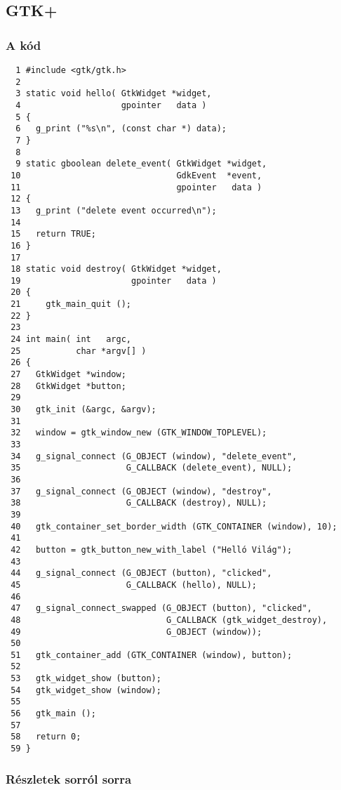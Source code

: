\documentclass[a4paper,10pt]{article}
\begin{document}
\subsection{GTK+}

\subsubsection{A kód}

\vspace{16pt}
\fontsize{6pt}{6pt}
\begin{verbatim}
  1 #include <gtk/gtk.h>
  2
  3 static void hello( GtkWidget *widget,
  4                    gpointer   data )
  5 {
  6   g_print ("%s\n", (const char *) data);
  7 }
  8
  9 static gboolean delete_event( GtkWidget *widget,
 10                               GdkEvent  *event,
 11                               gpointer   data )
 12 {
 13   g_print ("delete event occurred\n");
 14
 15   return TRUE;
 16 }
 17
 18 static void destroy( GtkWidget *widget,
 19                      gpointer   data )
 20 {
 21     gtk_main_quit ();
 22 }
 23
 24 int main( int   argc,
 25           char *argv[] )
 26 {
 27   GtkWidget *window;
 28   GtkWidget *button;
 29
 30   gtk_init (&argc, &argv);
 31
 32   window = gtk_window_new (GTK_WINDOW_TOPLEVEL);
 33
 34   g_signal_connect (G_OBJECT (window), "delete_event",
 35                     G_CALLBACK (delete_event), NULL);
 36
 37   g_signal_connect (G_OBJECT (window), "destroy",
 38                     G_CALLBACK (destroy), NULL);
 39
 40   gtk_container_set_border_width (GTK_CONTAINER (window), 10);
 41
 42   button = gtk_button_new_with_label ("Helló Világ");
 43
 44   g_signal_connect (G_OBJECT (button), "clicked",
 45                     G_CALLBACK (hello), NULL);
 46
 47   g_signal_connect_swapped (G_OBJECT (button), "clicked",
 48                             G_CALLBACK (gtk_widget_destroy),
 49                             G_OBJECT (window));
 50
 51   gtk_container_add (GTK_CONTAINER (window), button);
 52
 53   gtk_widget_show (button);
 54   gtk_widget_show (window);
 55
 56   gtk_main ();
 57
 58   return 0;
 59 }
\end{verbatim} 

\subsubsection{Részletek sorról sorra}
\end{document}
